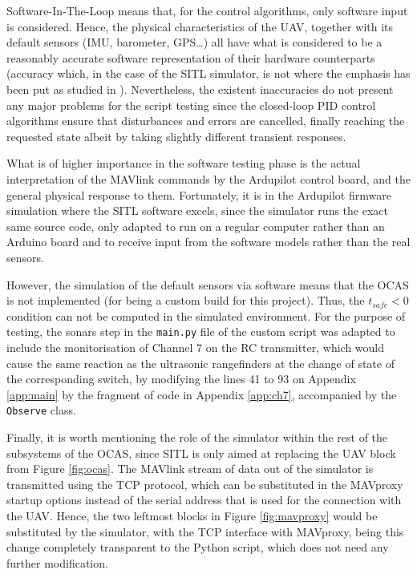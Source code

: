 Software-In-The-Loop means that, for the control algorithms, only software input is considered.
Hence, the physical characteristics of the UAV, together with its default sensors (IMU, barometer, GPS\ldots) all have what is considered to be a reasonably accurate software representation of their hardware counterparts (accuracy which, in the case of the SITL simulator, is not where the emphasis has been put as studied in \cite{vegaastorga2016}).
Nevertheless, the existent inaccuracies do not present any major problems for the script testing since the closed-loop PID control algorithms ensure that disturbances and errors are cancelled, finally reaching the requested state albeit by taking slightly different transient responses.

What is of higher importance in the software testing phase is the actual interpretation of the MAVlink commands by the Ardupilot control board, and the general physical response to them.
Fortunately, it is in the Ardupilot firmware simulation where the SITL software excels, since the simulator runs the exact same source code, only adapted to run on a regular computer rather than an Arduino board and to receive input from the software models rather than the real sensors.

However, the simulation of the default sensors via software means that the OCAS is not implemented (for being a custom build for this project).
Thus, the $t_{safe}<0$ condition can not be computed in the simulated environment.
For the purpose of testing, the sonars step in the \texttt{main.py} file of the custom script was adapted to include the monitorisation of Channel 7 on the RC transmitter, which would cause the same reaction as the ultrasonic rangefinders at the change of state of the corresponding switch, by modifying the lines 41 to 93 on Appendix \ref{app:main} by the fragment of code in Appendix \ref{app:ch7}, accompanied by the \texttt{Observe} class.

Finally, it is worth mentioning the role of the simulator within the rest of the subsystems of the OCAS, since SITL is only aimed at replacing the UAV block from Figure \ref{fig:ocas}.
The MAVlink stream of data out of the simulator is transmitted using the TCP protocol, which can be substituted in the MAVproxy startup options instead of the serial address that is used for the connection with the UAV.
Hence, the two leftmost blocks in Figure \ref{fig:mavproxy} would be substituted by the simulator, with the TCP interface with MAVproxy, being this change completely transparent to the Python script, which does not need any further modification.

